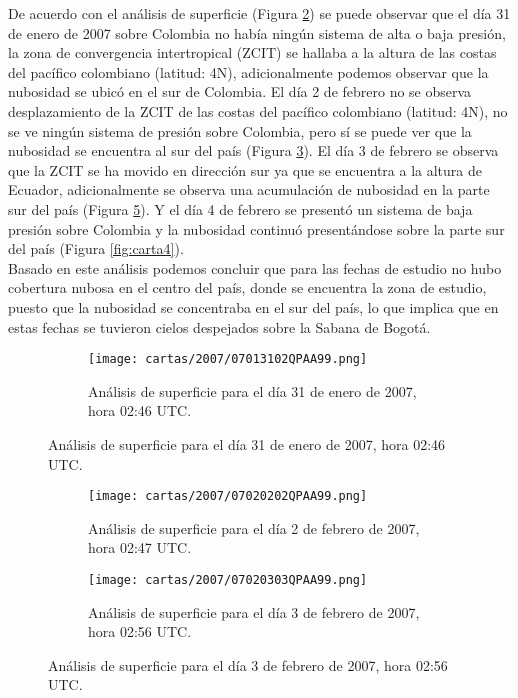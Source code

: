 De acuerdo con el análisis de superficie (Figura \ref{fig:carta1}) se puede observar que el día 31 de enero de 2007 sobre Colombia no había ningún sistema de alta o baja presión, la zona de convergencia intertropical (ZCIT) se hallaba a la altura de las costas del pacífico colombiano (latitud: 4\degree N), adicionalmente podemos observar que la nubosidad se ubicó en el sur de Colombia. El día 2 de febrero no se observa desplazamiento de la ZCIT de las costas del pacífico colombiano (latitud: 4\degree N), no se ve ningún sistema de presión sobre Colombia, pero sí se puede ver que la nubosidad se encuentra al sur del país (Figura \ref{fig:carta2}). El día 3 de febrero se observa que la ZCIT se ha movido en dirección sur ya que se encuentra a la altura de Ecuador, adicionalmente se observa una acumulación de nubosidad en la parte sur del país (Figura \ref{fig:carta3}). Y el día 4 de febrero se presentó un sistema de baja presión sobre Colombia y la nubosidad continuó presentándose sobre la parte sur del país (Figura \ref{fig:carta4}).\\

Basado en este análisis podemos concluir que para las fechas de estudio no hubo cobertura nubosa en el centro del país, donde se encuentra la zona de estudio, puesto que la nubosidad se concentraba en el sur del país, lo que implica que en estas fechas se tuvieron cielos despejados sobre la Sabana de Bogotá.

\begin{figure}[H]
	\centering
		\begin{subfigure}[normla]{0.9\textwidth}
		\caption{Análisis de superficie para el día 31 de enero de 2007, hora 02:46 UTC.}
	\texttt{[image: cartas/2007/07013102QPAA99.png]}
		\label{fig:carta1}
		\end{subfigure}
\end{figure}
           
\begin{figure}[H]\ContinuedFloat
		\centering
				\begin{subfigure}[normla]{0.9\textwidth}
		\caption{Análisis de superficie para el día 2 de febrero de 2007, hora 02:47 UTC.}
	\texttt{[image: cartas/2007/07020202QPAA99.png]}
		\label{fig:carta2}
		\end{subfigure}

    \centering
    \begin{subfigure}[normla]{0.9\textwidth}
		\caption{Análisis de superficie para el día 3 de febrero de 2007, hora 02:56 UTC.}
	\texttt{[image: cartas/2007/07020303QPAA99.png]}
		\label{fig:carta3}
		\end{subfigure}
\end{figure}
           
